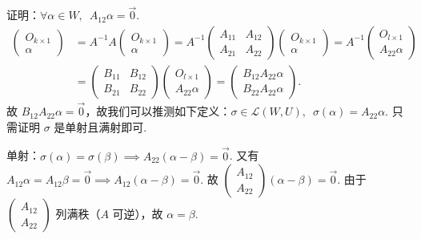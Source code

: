\documentclass[UTF8,12pt,a4paper,fontset=fandol]{ctexart}
\begin{document}
\begin{solve}
证明：$ \forall \alpha \in W,\enspace A_{12} \alpha = \vec{0} $.
            \begin{align*}
                \begin{pmatrix} O_{k \times 1} \\ \alpha \end{pmatrix}
                & = A^{-1}A \begin{pmatrix} O_{k \times 1} \\ \alpha \end{pmatrix} = A^{-1} \begin{pmatrix} A_{11} & A_{12} \\ A_{21} & A_{22} \end{pmatrix} \begin{pmatrix} O_{k \times 1} \\ \alpha \end{pmatrix} = A^{-1} \begin{pmatrix} O_{l \times 1} \\ A_{22} \alpha \end{pmatrix} \\
                & = \begin{pmatrix} B_{11} & B_{12} \\ B_{21} & B_{22} \end{pmatrix} \begin{pmatrix} O_{l \times 1} \\ A_{22} \alpha \end{pmatrix} = \begin{pmatrix} B_{12} A_{22} \alpha \\ B_{22} A_{22} \alpha \end{pmatrix}.
            \end{align*}
            故 $ B_{12} A_{22} \alpha = \vec{0} $，故我们可以推测如下定义：$ \sigma \in \mathcal{L}(W,U),\enspace \sigma(\alpha) = A_{22} \alpha $.
            只需证明 $ \sigma $ 是单射且满射即可.

            单射：$ \sigma(\alpha) = \sigma(\beta) \implies A_{22}(\alpha - \beta) = \vec{0} $. 又有 $ A_{12} \alpha = A_{12} \beta = \vec{0} \implies A_{12}( \alpha - \beta) = \vec{0} $. 故 $ \begin{pmatrix} A_{12} \\ A_{22} \end{pmatrix} (\alpha - \beta) = \vec{0} $. 由于 $ \begin{pmatrix} A_{12} \\ A_{22} \end{pmatrix} $ 列满秩（$ A $ 可逆），故 $ \alpha = \beta $.


\end{solve}
\end{document}
